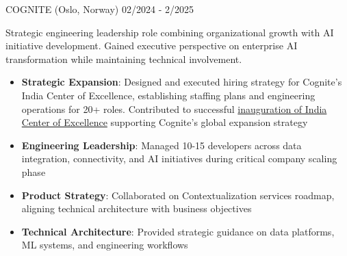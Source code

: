 \documentclass[singlesided,
               paper=a4,
               fontsize=10pt
              ]{my-resume}
\begin{document}
%    
	{COGNITE (Oslo, Norway)}
    {02/2024 - 2/2025}
    {
        Strategic engineering leadership role combining organizational growth with AI initiative development. Gained executive perspective on enterprise AI transformation while maintaining technical involvement.

        \begin{itemize}[leftmargin=2em]
            \item \textbf{Strategic Expansion}: Designed and executed hiring strategy for Cognite's India Center of Excellence, establishing staffing plans and engineering operations for 20+ roles. Contributed to successful \href{https://www.cognite.com/en/company/newsroom/cognite-inaugurates-india-center-of-excellence-in-bengaluru-with-commitment-to-leveraging-ai-for-industrial-growth}{inauguration of India Center of Excellence} supporting Cognite's global expansion strategy
            \item \textbf{Engineering Leadership}: Managed 10-15 developers across data integration, connectivity, and AI initiatives during critical company scaling phase
            \item \textbf{Product Strategy}: Collaborated on Contextualization services roadmap, aligning technical architecture with business objectives
            \item \textbf{Technical Architecture}: Provided strategic guidance on data platforms, ML systems, and engineering workflows
        \end{itemize}
    }

\clearpage
\pagestyle{empty}
\end{document}

